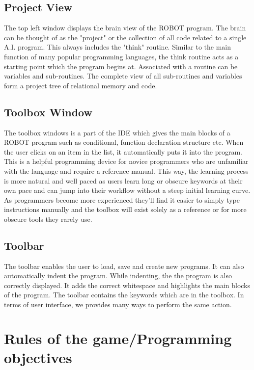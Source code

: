 \documentclass[a4paper]{article}
\begin{document}
\subsection{Project View}

The top left window displays the brain view of the ROBOT program. The brain can be thought of as the "project" or the collection of all code related to a single A.I. program. This always includes the "think" routine. Similar to the main function of many popular programming languages, the think routine acts as a starting point which the program begins at. Associated with a routine can be variables and sub-routines. The complete view of all sub-routines and variables form a project tree of relational memory and code.

\subsection{Toolbox Window}

The toolbox windows is a part of the IDE which gives the main blocks of a ROBOT program such as conditional, function declaration structure etc. When the user clicks on an item in the list, it automatically puts it into the program. This is a helpful programming device for novice programmers who are unfamiliar with the language and require a reference manual. This way, the learning process is more natural and well paced as users learn long or obscure keywords at their own pace and can jump into their workflow without a steep initial learning curve. As programmers become more experienced they'll find it easier to simply type instructions manually and the toolbox will exist solely as a reference or for more obscure tools they rarely use.

\subsection{Toolbar}

The toolbar enables the user to load, save and create new programs. It can also automatically indent the program. While indenting, the the program is also correctly displayed. It adds the correct whitespace and highlights the main blocks of the program.
The toolbar contains the keywords which are in the toolbox. In terms of user interface, we provides many ways to perform the same action.

\section{Rules of the game/Programming objectives}
\end{document}
